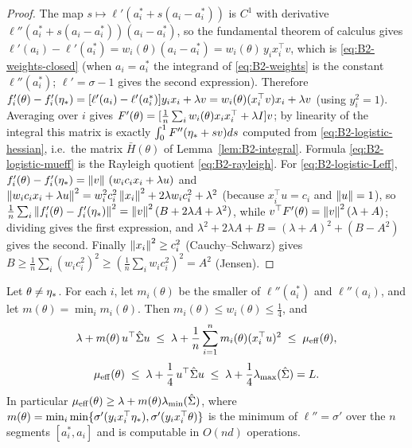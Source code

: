 \begin{proof}
The map $s\mapsto\ell'(a_i^\ast+s(a_i-a_i^\ast))$ is $C^1$ with derivative
$\ell''(a_i^\ast+s(a_i-a_i^\ast))(a_i-a_i^\ast)$, so the fundamental theorem of calculus gives
$\ell'(a_i)-\ell'(a_i^\ast)=w_i(\theta)(a_i-a_i^\ast)=w_i(\theta)\,y_ix_i^\top v$, which is \eqref{eq:B2-weights-closed}
(when $a_i=a_i^\ast$ the integrand of \eqref{eq:B2-weights} is the constant $\ell''(a_i^\ast)$; $\ell'=\sigma-1$ gives the
second expression). Therefore
$f'_i(\theta)-f'_i(\eta_\ast)=[\ell'(a_i)-\ell'(a_i^\ast)]y_ix_i+\lambda v=w_i(\theta)(x_i^\top v)x_i+\lambda v$
(using $y_i^2=1$). Averaging over $i$ gives $F'(\theta)=[\frac1n\sum_iw_i(\theta)x_ix_i^\top+\lambda I]v$; by
linearity of the integral this matrix is exactly $\int_0^1F''(\eta_\ast+sv)ds$ computed from
\eqref{eq:B2-logistic-hessian}, i.e.\ the matrix $\bar H(\theta)$ of Lemma~\ref{lem:B2-integral}. Formula
\eqref{eq:B2-logistic-mueff} is the Rayleigh quotient \eqref{eq:B2-rayleigh}. For \eqref{eq:B2-logistic-Leff},
$f'_i(\theta)-f'_i(\eta_\ast)=\left\|v\right\|\,(w_ic_ix_i+\lambda u)$ and
$\left\|w_ic_ix_i+\lambda u\right\|^2=w_i^2c_i^2\left\|x_i\right\|^2+2\lambda w_ic_i^2+\lambda^2$ (because $x_i^\top u=c_i$ and
$\left\|u\right\|=1$), so $\frac1n\sum_i\left\|f'_i(\theta)-f'_i(\eta_\ast)\right\|^2=\left\|v\right\|^2(B+2\lambda A+\lambda^2)$, while
$v^\top F'(\theta)=\left\|v\right\|^2(\lambda+A)$; dividing gives the first expression, and
$\lambda^2+2\lambda A+B=(\lambda+A)^2+(B-A^2)$ gives the second. Finally $\left\|x_i\right\|^2\ge c_i^2$
(Cauchy--Schwarz) gives $B\ge\frac1n\sum_i(w_ic_i^2)^2\ge(\frac1n\sum_iw_ic_i^2)^2=A^2$ (Jensen).
\end{proof}

\begin{lemma}\label{lem:B2-logistic-bounds}
Let $\theta\neq\eta_\ast$. For each $i$, let $m_i(\theta)$ be the smaller of $\ell''(a_i^\ast)$ and $\ell''(a_i)$, and let
$m(\theta)=\min_im_i(\theta)$. Then $m_i(\theta)\le w_i(\theta)\le\frac14$, and
\begin{equation}\label{ineq:logistic-lower}
\lambda+m(\theta)\,u^\top\hat\Sigma u\;\le\;\lambda+\frac1n\sum_{i=1}^nm_i(\theta)(x_i^\top u)^2\;\le\;\mu_{\mathrm{eff}}(\theta),
\end{equation}
\begin{equation}\label{ineq:logistic-upper}
\mu_{\mathrm{eff}}(\theta)\;\le\;\lambda+\frac14\,u^\top\hat\Sigma u\;\le\;\lambda+\frac14\lambda_{\max}(\hat\Sigma)=L .
\end{equation}
In particular $\mu_{\mathrm{eff}}(\theta)\ge\lambda+m(\theta)\lambda_{\min}(\hat\Sigma)$, where
$m(\theta)=\min_i\min\{\sigma'(y_ix_i^\top\eta_\ast),\sigma'(y_ix_i^\top\theta)\}$ is the minimum of $\ell''=\sigma'$
over the $n$ segments $[a_i^\ast,a_i]$ and is computable in $O(nd)$ operations.
\end{lemma}

